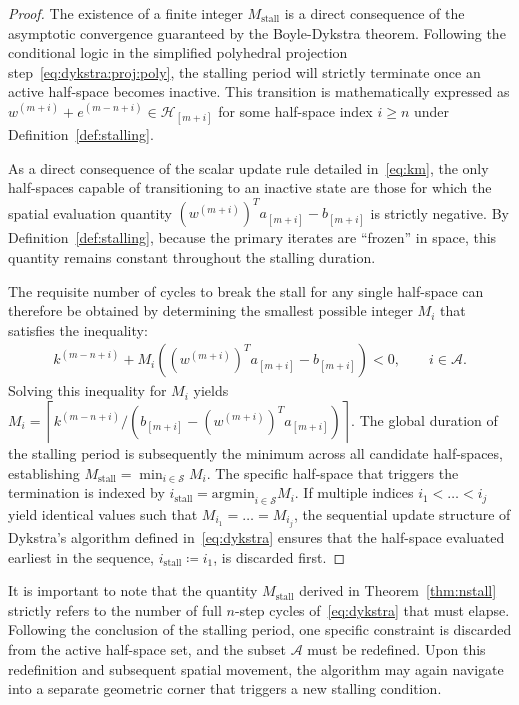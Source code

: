 \begin{proof}
The existence of a finite integer $M_\text{stall}$ is a direct consequence of the asymptotic convergence guaranteed by the Boyle-Dykstra theorem. Following the conditional logic in the simplified polyhedral projection step~\eqref{eq:dykstra:proj:poly}, the stalling period will strictly terminate once an active half-space becomes inactive. This transition is mathematically expressed as $w^{(m+i)} + e^{(m-n+i)} \in \mathcal{H}_{[m+i]}$ for some half-space index $i \geq n$ under Definition~\ref{def:stalling}. 

As a direct consequence of the scalar update rule detailed in~\eqref{eq:km}, the only half-spaces capable of transitioning to an inactive state are those for which the spatial evaluation quantity $(w^{(m+i)})^T a_{[m+i]} - b_{[m+i]}$ is strictly negative. By Definition~\ref{def:stalling}, because the primary iterates are ``frozen'' in space, this quantity remains constant throughout the stalling duration. 

The requisite number of cycles to break the stall for any single half-space can therefore be obtained by determining the smallest possible integer $M_i$ that satisfies the inequality:
\begin{align*}
k^{(m-n+i)} + M_i \left((w^{(m+i)})^T a_{[m+i]} - b_{[m+i]}\right) < 0, \qquad i \in \mathcal{A}.
\end{align*}
Solving this inequality for $M_i$ yields $M_i = \left\lceil k^{(m-n+i)} / \left(b_{[m+i]} - (w^{(m+i)})^T a_{[m+i]}\right)\right\rceil$. The global duration of the stalling period is subsequently the minimum across all candidate half-spaces, establishing $M_\text{stall} = \min_{i \in \mathcal{S}} M_i$. The specific half-space that triggers the termination is indexed by $i_\text{stall} = \text{argmin}_{i \in \mathcal{S}} M_i$. If multiple indices $i_1 < \dots < i_j$ yield identical values such that $M_{i_1} = \dots = M_{i_j}$, the sequential update structure of Dykstra's algorithm defined in~\eqref{eq:dykstra} ensures that the half-space evaluated earliest in the sequence, $i_\text{stall} \coloneqq i_1$, is discarded first.
\end{proof}

It is important to note that the quantity $M_\text{stall}$ derived in Theorem~\ref{thm:nstall} strictly refers to the number of full $n$-step cycles of~\eqref{eq:dykstra} that must elapse. Following the conclusion of the stalling period, one specific constraint is discarded from the active half-space set, and the subset $\mathcal{A}$ must be redefined. Upon this redefinition and subsequent spatial movement, the algorithm may again navigate into a separate geometric corner that triggers a new stalling condition.